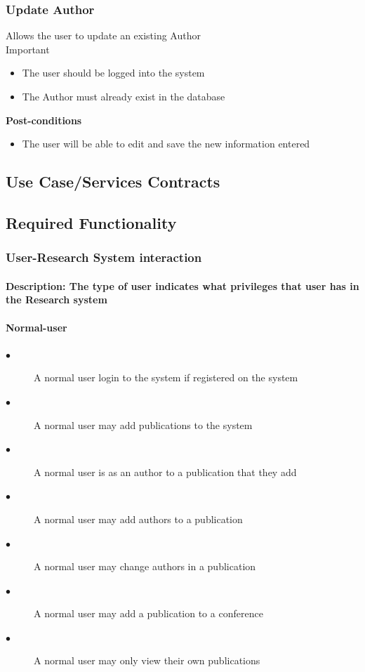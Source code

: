 \documentclass[a4paper]{article}
\begin{document}
	\subsubsection{Update Author}
	 Allows the user to update an existing Author\\
	 Important\\
	
	 \begin{itemize}
		\item The user should be logged into the system
		\item The Author must already exist in the database
	\end{itemize}
	
	\textbf{Post-conditions}
	 \begin{itemize}
		\item The user will be able to edit and save the new information entered
	\end{itemize}
    
	\subsection{Use Case/Services Contracts}
	
	\subsection{Required Functionality}
	\subsubsection{User-Research System interaction}
	\paragraph{\textbf{Description:} The type of user indicates what privileges that user has in the Research system}
	\paragraph{\textbf{Normal-user}}
	\begin{description}
		\item[$\bullet$] A normal user login to the system if registered on the system
		\item[$\bullet$] A normal user may add publications to the system
		\item[$\bullet$] A normal user is as an author to a publication that they add
		\item[$\bullet$] A normal user may add authors to a publication
		\item[$\bullet$] A normal user may change authors in a publication
		\item[$\bullet$] A normal user may add a publication to a conference
		\item[$\bullet$] A normal user may only view their own publications
	\end{description}
\end{document}
